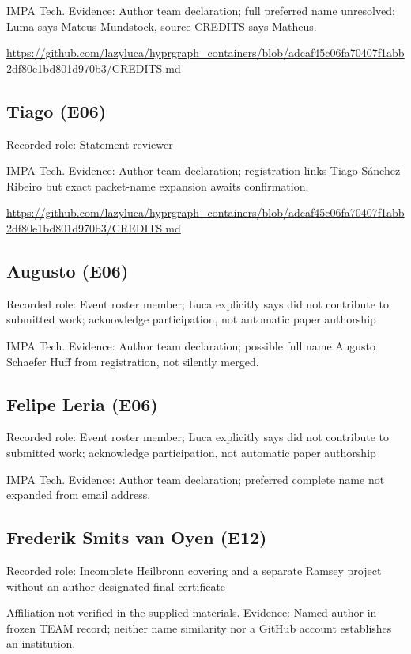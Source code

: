 \documentclass[11pt,a4paper]{article}
\begin{document}
IMPA Tech. Evidence: Author team declaration; full preferred name unresolved; Luma says Mateus Mundstock, source CREDITS says Matheus.

{\small \url{https://github.com/lazyluca/hyprgraph_containers/blob/adcaf45c06fa70407f1abb2df80e1bd801d970b3/CREDITS.md}\par}

\subsection{Tiago (E06)}
Recorded role: Statement reviewer

IMPA Tech. Evidence: Author team declaration; registration links Tiago Sánchez Ribeiro but exact packet-name expansion awaits confirmation.

{\small \url{https://github.com/lazyluca/hyprgraph_containers/blob/adcaf45c06fa70407f1abb2df80e1bd801d970b3/CREDITS.md}\par}

\subsection{Augusto (E06)}
Recorded role: Event roster member; Luca explicitly says did not contribute to submitted work; acknowledge participation, not automatic paper authorship

IMPA Tech. Evidence: Author team declaration; possible full name Augusto Schaefer Huff from registration, not silently merged.

\subsection{Felipe Leria (E06)}
Recorded role: Event roster member; Luca explicitly says did not contribute to submitted work; acknowledge participation, not automatic paper authorship

IMPA Tech. Evidence: Author team declaration; preferred complete name not expanded from email address.

\subsection{Frederik Smits van Oyen (E12)}
Recorded role: Incomplete Heilbronn covering and a separate Ramsey project without an author-designated final certificate

Affiliation not verified in the supplied materials. Evidence: Named author in frozen TEAM record; neither name similarity nor a GitHub account establishes an institution.
\end{document}
